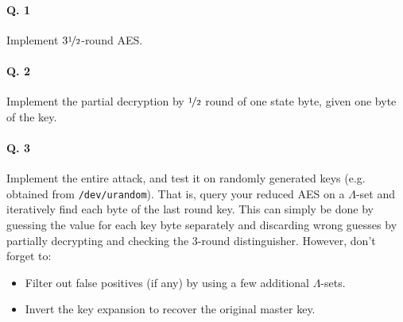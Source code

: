 \documentclass[a4paper,11pt]{article}
\begin{document}
\paragraph*{Q. 1} Implement $3\nicefrac{1}{2}$-round AES.

\paragraph*{Q. 2} Implement the partial decryption by $\nicefrac{1}{2}$ round of one state byte, given one byte of the key.

\paragraph*{Q. 3} Implement the entire attack, and test it on randomly generated keys (e.g. obtained from \texttt{/dev/urandom}). That is, query
your reduced AES on a $\Lambda$-set and iteratively find each byte of the last round key. This can simply be done by guessing the value for each key
byte separately and discarding wrong guesses by partially decrypting and checking the 3-round distinguisher. However, don't forget to:
\begin{itemize}
\item Filter out false positives (if any) by using a few additional $\Lambda$-sets.
\item Invert the key expansion to recover the original master key.
\end{itemize} 
\end{document}
